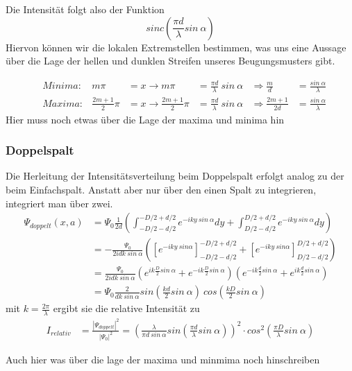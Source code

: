 \documentclass[]{article}
\begin{document}
Die Intensität folgt also der Funktion 
\begin{equation}
	sinc(\frac{\pi d}{\lambda} sin \: \alpha)
\end{equation} 
Hiervon können wir die lokalen Extremstellen bestimmen, was uns eine Aussage über die Lage der hellen und dunklen Streifen unseres Beugungsmusters gibt.

\begin{align}
	&Minima: &m\pi&= x \rightarrow m\pi &= \frac{\pi d}{\lambda} \: sin \: \alpha	&\Rightarrow \frac{m}{d} &=\frac{sin \: \alpha}{\lambda}\\
	&Maxima: &\frac{2m+1}{2}\pi&=x \rightarrow \frac{2m+1}{2}\pi &= \frac{\pi d}{\lambda}\:sin \: \alpha &\Rightarrow \frac{2m +1}{2d}&=\frac{sin \: \alpha}{\lambda}
\end{align}
Hier muss noch etwas über die Lage der maxima und minima hin
\subsubsection{Doppelspalt}
Die Herleitung der Intensitätsverteilung beim Doppelspalt erfolgt analog zu der beim Einfachspalt. Anstatt aber nur über den einen Spalt zu integrieren, integriert man über zwei. 
\begin{align}
	\Psi_{doppelt}(x,a)&=\Psi_{0}\frac{1}{2d}(\int_{-D/2-d/2}^{-D/2+d/2}e^{-iky \: sin \: \alpha}dy+\int_{D/2-d/2}^{D/2+d/2}e^{-iky \: sin \: \alpha}dy)\\
%
	&=-\frac{\Psi_{0}}{2idk \: sin \: \alpha}([e^{-iky \: sin \alpha}]_{-D/2-d/2}^{-D/2+d/2}+[e^{-iky \: sin \alpha}]_{D/2-d/2}^{D/2+d/2})\\
%
	&=\frac{\Psi_{0}}{2idk \: sin \: \alpha}(e^{ik\frac{D}{2} sin \: \alpha}+ e^{-ik\frac{D}{2} sin \: \alpha})(e^{-ik\frac{d}{2} sin \: \alpha}+ e^{ik\frac{d}{2} sin \: \alpha})\\
	&=\Psi_{0}\frac{2}{dk \: sin \: \alpha}sin (\frac{kd}{2} sin \: \alpha)\: cos(\frac{kD}{2}sin \: \alpha)
\end{align}
mit $k=\frac{2 \pi}{\lambda}$ ergibt sie die relative Intensität zu
\begin{align}
	I_{relativ}&=	\frac{|\Psi_{doppelt}|^2}{|\Psi_{0}|^2}=\left( \frac{\lambda}{\pi d \: sin \: \alpha}sin \left(  \frac{\pi d}{\lambda} sin \: \alpha \right)\right)^2 \cdot cos^2 \left( \frac{\pi D}{\lambda}sin \: \alpha \right) 
\end{align}

Auch hier was über die lage der maxima und minmima noch hinschreiben
\end{document}
